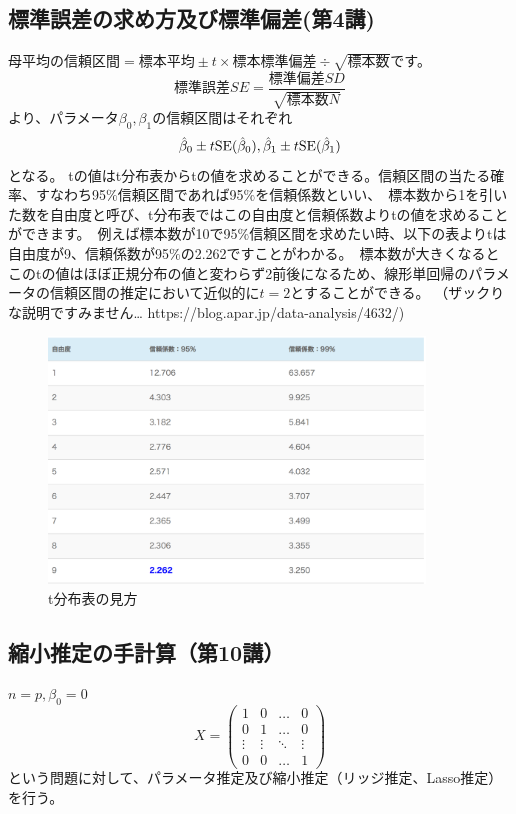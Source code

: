 \documentclass[uplatex]{jsarticle}
\begin{document}
\subsection{標準誤差の求め方及び標準偏差(第4講)}
母平均の信頼区間$ = 標本平均 \pm t \times 標本標準偏差 \div \sqrt{標本数}$です。
$$標準誤差 SE = \frac{標準偏差 SD}{\sqrt{標本数 N}}$$より、パラメータ$\beta_0, \beta_1$の信頼区間はそれぞれ
$$\hat{\beta}_0 \pm t{\rm SE}(\hat{\beta}_0), \hat{\beta}_1 \pm t{\rm SE}(\hat{\beta}_1)$$となる。
tの値はt分布表からtの値を求めることができる。信頼区間の当たる確率、すなわち95$\%$信頼区間であれば95$\%$を信頼係数といい、\
標本数から1を引いた数を自由度と呼び、t分布表ではこの自由度と信頼係数よりtの値を求めることができます。\
例えば標本数が10で95$\%$信頼区間を求めたい時、以下の表よりtは自由度が9、信頼係数が95$\%$の2.262ですことがわかる。\
標本数が大きくなるとこのtの値はほぼ正規分布の値と変わらず2前後になるため、線形単回帰のパラメータの信頼区間の推定において近似的に$t=2$とすることができる。
（ザックりな説明ですみません… https://blog.apar.jp/data-analysis/4632/)
\begin{figure}
  \begin{center}
  \includegraphics[width=10cm]{img/t_bunpu.png}
  \caption{t分布表の見方}
\end{center}
\end{figure}

\subsection{縮小推定の手計算（第10講）}
$n = p, \beta_0 = 0$
\[
  X = \left(
    \begin{array}{cccc}
      1 & 0 & \ldots & 0 \\
      0 & 1 & \ldots & 0 \\
      \vdots & \vdots & \ddots & \vdots \\
      0 & 0 & \ldots & 1
    \end{array}
  \right)
\]
という問題に対して、パラメータ推定及び縮小推定（リッジ推定、Lasso推定）を行う。
\end{document}
